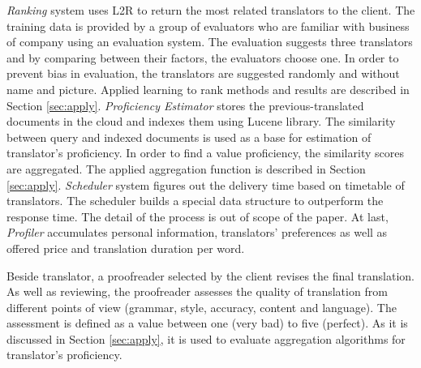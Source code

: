 \textit{Ranking} system uses L2R to return the most related translators to the client. The training data is provided by a group of evaluators who are familiar with business of company using an evaluation system. The evaluation suggests three translators and by comparing between their factors, the evaluators choose one. In order to prevent bias in evaluation, the translators are suggested randomly and without name and picture. Applied learning to rank methods and results are described in Section \ref{sec:apply}. \textit{Proficiency Estimator} stores the previous-translated documents in the cloud and indexes them using Lucene library. The similarity between query and indexed documents is used as a base for estimation of translator's proficiency. In order to find a value proficiency, the similarity scores are aggregated. The applied aggregation function is described in Section \ref{sec:apply}. \textit{Scheduler} system figures out the delivery time based on timetable of translators. The scheduler builds a special data structure to outperform the response time. The detail of the process is out of scope of the paper. At last, \textit{Profiler} accumulates personal information, translators' preferences as well as offered price and translation duration per word.

Beside translator, a proofreader selected by the client revises the final translation. As well as reviewing, the proofreader assesses the quality of translation from different points of view (grammar, style, accuracy, content and language). The assessment is defined as a value between one (very bad) to five (perfect). As it is discussed in Section \ref{sec:apply}, it is used to evaluate aggregation algorithms for translator's proficiency.

